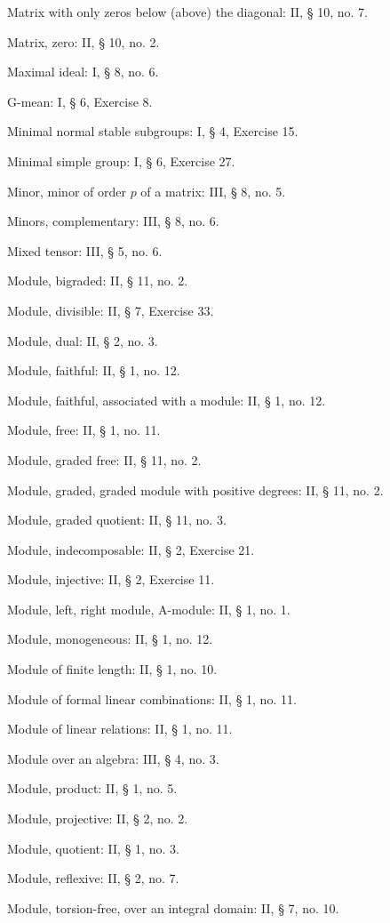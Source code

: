 Matrix with only zeros below (above) the diagonal: II, § 10, no. 7.

Matrix, zero: II, § 10, no. 2.

Maximal ideal: I, § 8, no. 6.

G-mean: I, § 6, Exercise 8.

Minimal normal stable subgroups: I, § 4, Exercise 15.

Minimal simple group: I, § 6, Exercise 27.

Minor, minor of order \(p\) of a matrix: III, § 8, no. 5.

Minors, complementary: III, § 8, no. 6.

Mixed tensor: III, § 5, no. 6.

Module, bigraded: II, § 11, no. 2.

Module, divisible: II, § 7, Exercise 33.

Module, dual: II, § 2, no. 3.

Module, faithful: II, § 1, no. 12.

Module, faithful, associated with a module: II, § 1, no. 12.

Module, free: II, § 1, no. 11.

Module, graded free: II, § 11, no. 2.

Module, graded, graded module with positive degrees: II, § 11, no. 2.

Module, graded quotient: II, § 11, no. 3.

Module, indecomposable: II, § 2, Exercise 21.

Module, injective: II, § 2, Exercise 11.

Module, left, right module, A-module: II, § 1, no. 1.

Module, monogeneous: II, § 1, no. 12.

Module of finite length: II, § 1, no. 10.

Module of formal linear combinations: II, § 1, no. 11.

Module of linear relations: II, § 1, no. 11.

Module over an algebra: III, § 4, no. 3.

Module, product: II, § 1, no. 5.

Module, projective: II, § 2, no. 2.

Module, quotient: II, § 1, no. 3.

Module, reflexive: II, § 2, no. 7.

Module, torsion-free, over an integral domain: II, § 7, no. 10.

